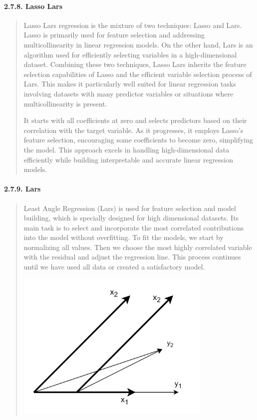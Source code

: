 \documentclass[
]{article}
\begin{document}
\hypertarget{lasso-lars}{%
\paragraph{\texorpdfstring{\textbf{2.7.8. Lasso
Lars}}{2.7.8. Lasso Lars}}\label{lasso-lars}}

\begin{quote}
Lasso Lars regression is the mixture of two techniques: Lasso and Lars.
Lasso is primarily used for feature selection and addressing
multicollinearity in linear regression models. On the other hand, Lars
is an algorithm used for efficiently selecting variables in a
high-dimensional dataset. Combining these two techniques, Lasso Lars
inherits the feature selection capabilities of Lasso and the efficient
variable selection process of Lars. This makes it particularly well
suited for linear regression tasks involving datasets with many
predictor variables or situations where multicollinearity is present.

It starts with all coefficients at zero and selects predictors based on
their correlation with the target variable. As it progresses, it employs
Lasso's feature selection, encouraging some coefficients to become zero,
simplifying the model. This approach excels in handling high-dimensional
data efficiently while building interpretable and accurate linear
regression models.
\end{quote}

\hypertarget{lars}{%
\paragraph{\texorpdfstring{\textbf{2.7.9.
Lars}}{2.7.9. Lars}}\label{lars}}

\begin{quote}
Least Angle Regression (Lars) is used for feature selection and model
building, which is specially designed for high dimensional datasets. Its
main task is to select and incorporate the most correlated contributions
into the model without overfitting. To fit the models, we start by
normalizing all values. Then we choose the most highly correlated
variable with the residual and adjust the regression line. This process
continues until we have used all data or created a satisfactory model.

\includegraphics[width=3.68229in,height=2.80917in]{vertopal_f239f640fefe43bb8bc0698cafd57825/media/image10.png}
\end{quote}
\end{document}
